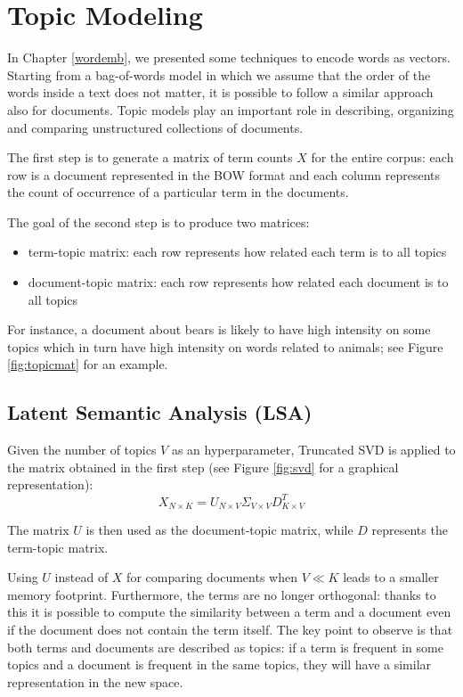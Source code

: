 \chapter{Topic Modeling}

In Chapter \ref{wordemb}, we presented some techniques to encode words as vectors.
Starting from a bag-of-words model in which we assume that the order of the words
inside a text does not matter, it is possible to follow a similar approach also for documents.
Topic models play an important role in describing, organizing and comparing unstructured collections of documents.

The first step is to generate a matrix of term counts $X$ for the entire corpus:
each row is a document represented in the BOW format and each column represents the count of occurrence
of a particular term in the documents.

The goal of the second step is to produce two matrices:
\begin{itemize}
    \item term-topic matrix: each row represents how related each term is to all topics
    \item document-topic matrix: each row represents how related each document is to all topics
\end{itemize}

For instance, a document about bears is likely to have high intensity on some topics which in turn have high
intensity on words related to animals; see Figure \ref{fig:topicmat} for an example.

\section{Latent Semantic Analysis (LSA)}
Given the number of topics $V$ as an hyperparameter,
Truncated SVD is applied to the matrix obtained in the first step
(see Figure \ref{fig:svd} for a graphical representation):
\[X_{N \times K} = U_{N \times V} \Sigma_{V \times V} D_{K \times V}^T\]

The matrix $U$ is then used as the document-topic matrix,
while $D$ represents the term-topic matrix.

Using $U$ instead of $X$ for comparing documents when $V \ll K$ leads to a smaller memory footprint.
Furthermore, the terms are no longer orthogonal: thanks to this it is possible to compute the similarity between
a term and a document even if the document does not contain the term itself.
The key point to observe is that both terms and documents are described as topics: if a term is frequent in some topics and
a document is frequent in the same topics, they will have a similar representation in the new space.

